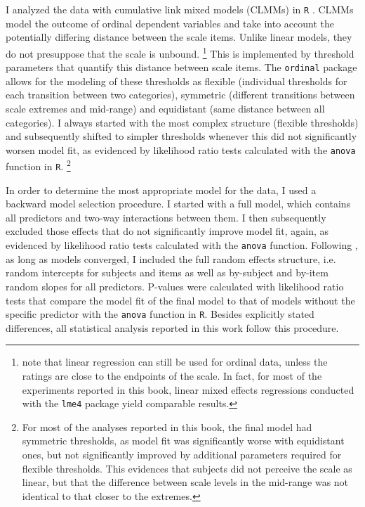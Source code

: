 I analyzed the data with cumulative link mixed models (CLMMs) \citep{christensen2015} in \texttt{R} \citep{rcoreteam2019}. CLMMs model the outcome of ordinal dependent variables and take into account the potentially differing distance between the scale items. Unlike linear models, they do not presuppose that the scale is unbound.%
%
\footnote{\citet[28]{gibson.etal2011} note that linear regression can still be used for ordinal data, unless the ratings are close to the endpoints of the scale. In fact, for most of the experiments reported in this book, linear mixed effects regressions conducted with the \texttt{lme4} package \citep{bates.etal2015} yield comparable results.}\afterfn%
%
This is implemented by threshold parameters that quantify this distance between scale items. The \texttt{ordinal} package allows for the modeling of these thresholds as flexible (individual thresholds for each transition between two categories), symmetric (different transitions between scale extremes and mid-range) and equidistant (same distance between all categories). I always started with the most complex structure (flexible thresholds) and subsequently shifted to simpler thresholds whenever this did not significantly worsen model fit, as evidenced by likelihood ratio tests calculated with the \texttt{anova} function in \texttt{R}.%
%
\footnote{For most of the analyses reported in this book, the final model had symmetric thresholds, as model fit was significantly worse with equidistant ones, but not significantly improved by additional parameters required for flexible thresholds. This evidences that subjects did not perceive the scale as linear, but that the difference between scale levels in the mid-range was not identical to that closer to the extremes.}\afterfn%
%

In order to determine the most appropriate model for the data, I used a backward model selection procedure. I started with a full model, which contains all predictors and two-way interactions between them. I then subsequently excluded those effects that do not significantly improve model fit, again, as evidenced by likelihood ratio tests calculated with the \texttt{anova} function. Following \citet{barr.etal2013}, as long as models converged, I included the full random effects structure, i.e. random intercepts for subjects and items as well as by-subject and by-item random slopes for all predictors. P-values were calculated with likelihood ratio tests that compare the model fit of the final model to that of models without the specific predictor with the \texttt{anova} function in \texttt{R}. Besides explicitly stated differences, all statistical analysis reported in this work follow this procedure.

